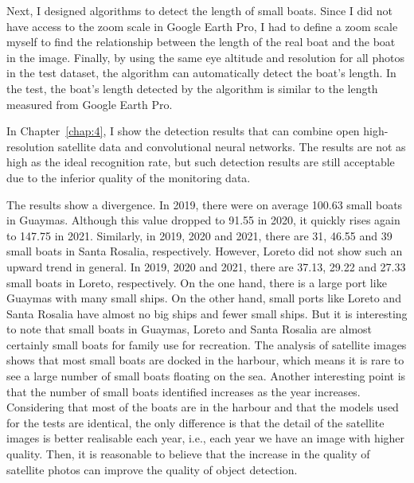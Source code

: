 Next, I designed algorithms to detect the length of small boats. Since I did not have access to the zoom scale in Google Earth Pro, I had to define a zoom scale myself to find the relationship between the length of the real boat and the boat in the image. Finally, by using the same eye altitude and resolution for all photos in the test dataset, the algorithm can automatically detect the boat's length. In the test, the boat's length detected by the algorithm is similar to the length measured from Google Earth Pro.

In Chapter~\ref{chap:4}, I show the detection results that can combine open high-resolution satellite data and convolutional neural networks. The results are not as high as the ideal recognition rate, but such detection results are still acceptable due to the inferior quality of the monitoring data. 

The results show a divergence. In 2019, there were on average 100.63 small boats in Guaymas. Although this value dropped to 91.55 in 2020, it quickly rises again to 147.75 in 2021. Similarly, in 2019, 2020 and 2021, there are 31, 46.55 and 39 small boats in Santa Rosalia, respectively. However, Loreto did not show such an upward trend in general. In 2019, 2020 and 2021, there are 37.13, 29.22 and 27.33 small boats in Loreto, respectively. On the one hand, there is a large port like Guaymas with many small ships. On the other hand, small ports like Loreto and Santa Rosalia have almost no big ships and fewer small ships. But it is interesting to note that small boats in Guaymas, Loreto and Santa Rosalia are almost certainly small boats for family use for recreation. The analysis of satellite images shows that most small boats are docked in the harbour, which means it is rare to see a large number of small boats floating on the sea. Another interesting point is that the number of small boats identified increases as the year increases. Considering that most of the boats are in the harbour and that the models used for the tests are identical, the only difference is that the detail of the satellite images is better realisable each year, i.e., each year we have an image with higher quality. Then, it is reasonable to believe that the increase in the quality of satellite photos can improve the quality of object detection.



 
